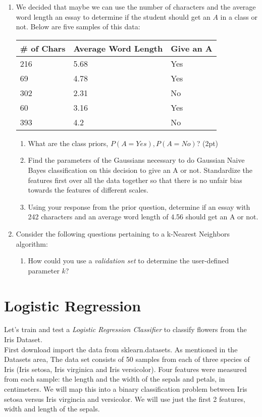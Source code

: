 \documentclass[12pt]{article}
\begin{document}
\begin{enumerate}
\item We decided that maybe we can use the number of characters and the average word length an essay to determine if the student should get an $A$ in a class or not.  Below are five samples of this data:
\begin{table}[h]
\begin{center}
\begin{tabular}{|l|l|l|}
\hline
\# of Chars & Average Word Length & Give an A\\
\hline
216 & 5.68 & Yes\\
69 & 4.78 & Yes\\
302 & 2.31 & No \\
60 & 3.16 & Yes \\
393 & 4.2 & No\\
\hline
\end{tabular}
\end{center}
\end{table}
	\begin{enumerate}
	\item What are the class priors, $P(A=Yes), P(A=No)$? (2pt)
	\item Find the parameters of the Gaussians necessary to do Gaussian Naive Bayes classification on this decision to give an A or not.  Standardize the features first over all the data together so that there is no unfair bias towards the features of different scales.
	\item Using your response from the prior question, determine if an essay with 242 characters and an average word length of 4.56 should get an A or not.
	\end{enumerate}
\item Consider the following questions pertaining to a k-Nearest Neighbors algorithm:
	\begin{enumerate}
	\item How could you use a \emph{validation set} to determine the user-defined parameter $k$?
	\end{enumerate}
\end{enumerate}


\newpage
\section{Logistic Regression}\label{naive}
Let's train and test a \emph{Logistic Regression Classifier} to classify flowers from the Iris Dataset.\\

\noindent
First download import the data from sklearn.datasets.  As mentioned in the Datasets area,  The data set consists of 50 samples from each of three species of Iris (Iris setosa, Iris virginica and Iris versicolor). Four features were measured from each sample: the length and the width of the sepals and petals, in centimeters.  We will map this into a binary classification problem between Iris setosa versus Iris virgincia and versicolor.  We will use just the first 2 features, width and length of the sepals.  
\end{document}
